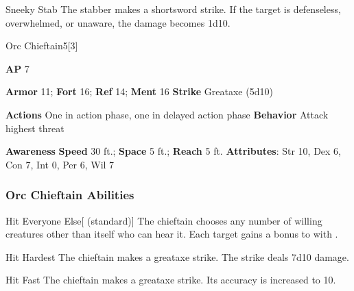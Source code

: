 \begin{freeability}{Sneeky Stab}
The stabber makes a shortsword strike.
If the target is defenseless, overwhelmed, or unaware, the damage becomes 1d10.
\end{freeability}

\begin{monsection}{Orc Chieftain}{5}[3]
\vspace{-1em}\vspace{-1em}
\begin{spellcontent}
\begin{spelltargetinginfo}
{\textbf{AP} 7}

\pari \textbf{Armor} 11;
\textbf{Fort} 16;
\textbf{Ref} 14;
\textbf{Ment} 16
\pari \textbf{Strike} Greataxe  (5d10)


\pari \textbf{Actions} One in action phase, one in delayed action phase
\pari \textbf{Behavior} Attack highest threat
\end{spelltargetinginfo}
\end{spellcontent}

\begin{monsterfooter}
\pari \textbf{Awareness} 
\pari \textbf{Speed} 30 ft.;
\textbf{Space} 5 ft.;
\textbf{Reach} 5 ft.
\pari \textbf{Attributes}:
Str 10,
Dex 6,
Con 7,
Int 0,
Per 6,
Wil 7
\end{monsterfooter}
\end{monsection}


\subsubsection{Orc Chieftain Abilities}

\begin{freeability}{Hit Everyone Else}[ (standard)]
The chieftain chooses any number of willing creatures other than itself who can hear it.
Each target gains a  bonus to  with .
\end{freeability}

\vspace{0.5em}
\begin{freeability}{Hit Hardest}
The chieftain makes a greataxe strike.
The strike deals 7d10 damage.
\end{freeability}

\vspace{0.5em}
\begin{freeability}{Hit Fast}
The chieftain makes a greataxe strike.
Its accuracy is increased to 10.
\end{freeability}

